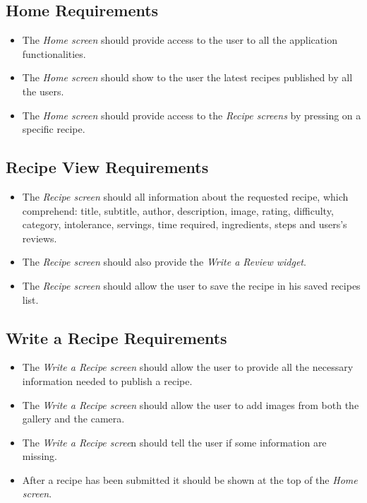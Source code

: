 	\subsection{Home Requirements}
		\begin{itemize}
			\item The \textit{Home screen} should provide access to the user to all the application functionalities.
			\item The \textit{Home screen} should show to the user the latest recipes published by all the users.
			\item The \textit{Home screen} should provide access to the \textit{Recipe screens} by pressing on a specific recipe.
		\end{itemize}

	\subsection{Recipe View Requirements}
	\begin{itemize}
		\item The \textit{Recipe screen} should all information about the requested recipe, which comprehend: title, subtitle, author, description, image, rating, difficulty, category, intolerance, servings, time required, ingredients, steps and users's reviews.
		\item The \textit{Recipe screen} should also provide the \textit{Write a Review widget}.
		\item The \textit{Recipe screen} should allow the user to save the recipe in his saved recipes list.
	\end{itemize}

	\subsection{Write a Recipe Requirements}
		\begin{itemize}
			\item The \textit{Write a Recipe screen} should allow the user to provide all the necessary information needed to publish a recipe.
			\item The \textit{Write a Recipe screen} should allow the user to add images from both the gallery and the camera.
			\item The \textit{Write a Recipe scree}n should tell the user if some information are missing.
			\item After a recipe has been submitted it should be shown at the top of the \textit{Home screen}.
		\end{itemize}

